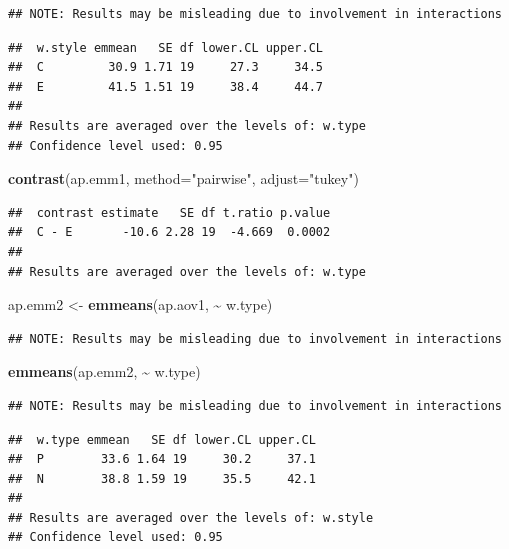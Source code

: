 \documentclass[
]{book}
\newenvironment{Shaded}{\begin{snugshade}}{\end{snugshade}}
\newcommand{\AttributeTok}[1]{\textcolor[rgb]{0.13,0.29,0.53}{#1}}
\newcommand{\FunctionTok}[1]{\textcolor[rgb]{0.13,0.29,0.53}{\textbf{#1}}}
\newcommand{\NormalTok}[1]{#1}
\newcommand{\OtherTok}[1]{\textcolor[rgb]{0.56,0.35,0.01}{#1}}
\newcommand{\SpecialCharTok}[1]{\textcolor[rgb]{0.81,0.36,0.00}{\textbf{#1}}}
\newcommand{\StringTok}[1]{\textcolor[rgb]{0.31,0.60,0.02}{#1}}
\begin{document}
\begin{verbatim}
## NOTE: Results may be misleading due to involvement in interactions
\end{verbatim}

\begin{verbatim}
##  w.style emmean   SE df lower.CL upper.CL
##  C         30.9 1.71 19     27.3     34.5
##  E         41.5 1.51 19     38.4     44.7
## 
## Results are averaged over the levels of: w.type 
## Confidence level used: 0.95
\end{verbatim}

\begin{Shaded}
\begin{Highlighting}[]
\FunctionTok{contrast}\NormalTok{(ap.emm1, }\AttributeTok{method=}\StringTok{"pairwise"}\NormalTok{, }\AttributeTok{adjust=}\StringTok{"tukey"}\NormalTok{)}
\end{Highlighting}
\end{Shaded}

\begin{verbatim}
##  contrast estimate   SE df t.ratio p.value
##  C - E       -10.6 2.28 19  -4.669  0.0002
## 
## Results are averaged over the levels of: w.type
\end{verbatim}

\begin{Shaded}
\begin{Highlighting}[]
\NormalTok{ap.emm2 }\OtherTok{\textless{}{-}} \FunctionTok{emmeans}\NormalTok{(ap.aov1,  }\SpecialCharTok{\textasciitilde{}}\NormalTok{ w.type)}
\end{Highlighting}
\end{Shaded}

\begin{verbatim}
## NOTE: Results may be misleading due to involvement in interactions
\end{verbatim}

\begin{Shaded}
\begin{Highlighting}[]
\FunctionTok{emmeans}\NormalTok{(ap.emm2, }\SpecialCharTok{\textasciitilde{}}\NormalTok{ w.type)}
\end{Highlighting}
\end{Shaded}

\begin{verbatim}
## NOTE: Results may be misleading due to involvement in interactions
\end{verbatim}

\begin{verbatim}
##  w.type emmean   SE df lower.CL upper.CL
##  P        33.6 1.64 19     30.2     37.1
##  N        38.8 1.59 19     35.5     42.1
## 
## Results are averaged over the levels of: w.style 
## Confidence level used: 0.95
\end{verbatim}
\end{document}
